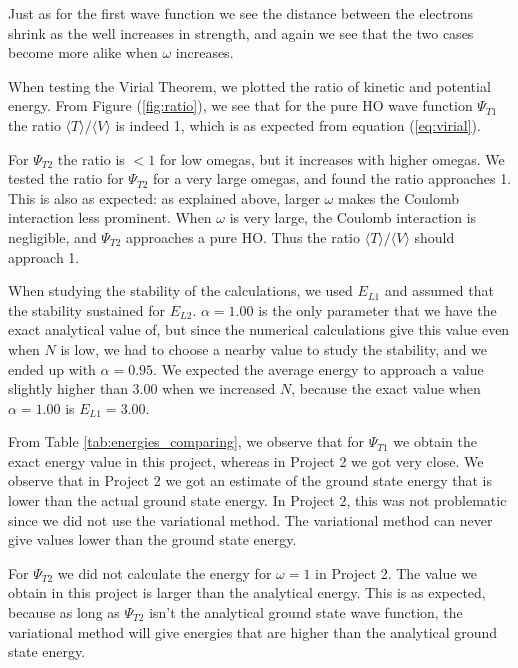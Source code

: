 \documentclass[norsk,a4paper,12pt]{article}
\begin{document}
Just as for the first wave function we see the distance between the electrons shrink as the well increases in strength, and again we see that the two cases become more alike when $\omega$ increases. \par \vspace{3mm}

When testing the Virial Theorem, we plotted the ratio of kinetic and potential energy. From Figure (\ref{fig:ratio}), we see that for the pure HO wave function  $\Psi_{T1}$ the ratio $\langle T \rangle/\langle V \rangle$ is indeed 1, which is as expected from equation (\ref{eq:virial}). \par
For $\Psi_{T2}$ the ratio is $< 1$ for low omegas, but it increases with higher omegas. We tested the ratio for $\Psi_{T2}$ for a very large omegas, and found the ratio approaches 1. This is also as expected: as explained above, larger $\omega$ makes the Coulomb interaction less prominent. When $\omega$ is very large, the Coulomb interaction is negligible, and $\Psi_{T2}$ approaches a pure HO. Thus the ratio $\langle T \rangle/\langle V \rangle$ should approach 1.
\par 
\vspace{3mm}

When studying the stability of the calculations, we used $E_{L1}$ and assumed that the stability sustained for $E_{L2}$. $\alpha=1.00$ is the only parameter that we have the exact analytical value of, but since the numerical calculations give this value even when $N$ is low, we had to choose a nearby value to study the stability, and we ended up with $\alpha=0.95$. We expected the average energy to approach a value slightly higher than 3.00 when we increased $N$, because the exact value when $\alpha=1.00$ is $E_{L1}=3.00$.\par\vspace{3mm} 

From Table \ref{tab:energies_comparing}, we observe that for $\Psi_{T1}$ we obtain the exact energy value in this project, whereas in Project 2 we got very close. We observe that in Project 2 we got an estimate of the ground state energy that is lower than the actual ground state energy. In Project 2, this was not problematic since we did not use the variational method. The variational method can never give values lower than the ground state energy. \par\vspace{3mm}
For $\Psi_{T2}$ we did not calculate the energy for $\omega =1$ in Project 2. The value we obtain in this project is larger than the analytical energy. This is as expected, because as long as $\Psi_{T2}$ isn't the analytical ground state wave function, the variational method  will give energies that are higher than the analytical ground state energy. 
\par 
\vspace{3mm}
\end{document}
